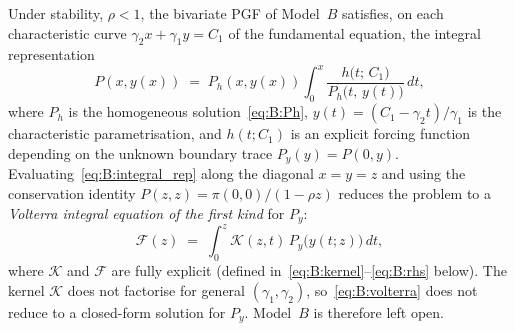 \begin{claim}\label{clm:B:volterra}
    Under stability, $\rho<1$, the bivariate PGF of Model~$B$ satisfies, on each
    characteristic curve $\gamma_2 x + \gamma_1 y = C_1$ of the fundamental equation,
    the integral representation
    \begin{equation}
        P(x,y(x)) \;=\; P_h(x,y(x))\int_{0}^{x}
        \frac{h\bigl(t;\,C_1\bigr)}{P_h\bigl(t,\,y(t)\bigr)}\,dt,
        \label{eq:B:integral_rep}
    \end{equation}
    where $P_h$ is the homogeneous solution~\eqref{eq:B:Ph}, $y(t)=(C_1-\gamma_2 t)/\gamma_1$
    is the characteristic parametrisation, and $h(t;C_1)$ is an explicit forcing
    function depending on the unknown boundary trace $P_y(y)=P(0,y)$.
    Evaluating~\eqref{eq:B:integral_rep} along the diagonal $x=y=z$ and using the
    conservation identity $P(z,z)=\pi(0,0)/(1-\rho z)$ reduces the problem to a
    \emph{Volterra integral equation of the first kind} for $P_y$:
    \begin{equation}
        \mathcal{F}(z) \;=\; \int_0^z \mathcal{K}(z,t)\,P_y\!\bigl(y(t;z)\bigr)\,dt,
        \label{eq:B:volterra}
    \end{equation}
    where $\mathcal{K}$ and $\mathcal{F}$ are fully explicit
    (defined in~\eqref{eq:B:kernel}--\eqref{eq:B:rhs} below). The kernel
    $\mathcal{K}$ does not factorise for general $(\gamma_1,\gamma_2)$,
    so~\eqref{eq:B:volterra} does not reduce to a closed-form solution for $P_y$.
    Model~$B$ is therefore left open.
\end{claim}

